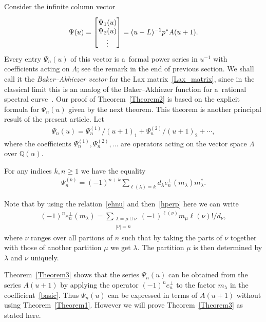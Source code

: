 \documentclass[pdftex]{sigma}
\numberwithin{equation}{section}
\renewcommand\ge{\geqslant}
\begin{document}
Consider the inf\/inite column vector
\begin{gather}
\label{psiu}
\Psi(u)=
\begin{bmatrix}
\raisebox{0pt}[12pt][0pt]{$\Psi_1(u)$}
\\
\Psi_2(u)
\\
\vdots
\end{bmatrix}
=(u-L)^{-1}p^{\ast}A(u+1).
\end{gather}
Every entry $\Psi_n(u)$ of this vector is a~formal power series in $u^{-1}$ with coef\/f\/icients acting on
$\Lambda$; see the remark in the end of previous section.
We shall call it the \emph{Baker--Akhiezer vector} for the Lax matrix~\eqref{Lax_matrix}, since in the
classical limit this is an analog of the Baker--Akhiezer function for a~rational spectral curve~\cite{Skl}.
Our proof of Theorem~\ref{Theorem2} is based on the explicit formula for $\Psi_n(u)$ given by the next theorem.
This theorem is another principal result of the present article.
Let
\begin{gather*}
\Psi_n(u)=\Psi^{(1)}_n/(u+1)_1+\Psi^{(2)}_n/(u+1)_2+\cdots,
\end{gather*}
where the coef\/f\/icients $\Psi^{(1)}_n,\Psi^{(2)}_n,\ldots$ are operators
acting on the vector space $\Lambda$ over $\mathbb Q(\alpha)$.
\begin{theorem}\label{Theorem3}
For any indices $k,n\ge1$ we have the equality
\begin{gather}
\label{psink}
\Psi^{(k)}_n=(-1)^{n+k}\sum_{\ell(\lambda)=k}d_\lambda e_n^{
\perp}(m_\lambda)m_\lambda^{\ast}.
\end{gather}
\end{theorem}

Note that by using the relation~\eqref{ehnu} and then~\eqref{hperp} here we can write
\begin{gather}\label{firstfactor}
(-1)^ne_n^{\perp}(m_\lambda)
=\sum\limits_{\substack{\lambda=\mu\sqcup\nu\\|\nu|=n}}(-1)^{\ell(\nu)}m_\mu\ell(\nu)!/d_\nu,
\end{gather}
where $\nu$ ranges over all partions of $n$ such that by taking the parts of $\nu$ together with those of
another partition $\mu$ we get $\lambda$.
The partition $\mu$ is then determined by $\lambda$ and $\nu$ uniquely.

Theorem~\ref{Theorem3} shows that the series $\Psi_n(u)$ can be obtained from the series $A(u+1)$ by applying the
operator $(-1)^ne_n^{\perp}$ to the factor $m_\lambda$ in the
coef\/f\/icient~\eqref{basic}.
Thus $\Psi_n(u)$ can be expressed in terms of $A(u+1)$ without using Theorem~\ref{Theorem1}.
However we will prove Theorem~\ref{Theorem3} as stated here.
\end{document}
